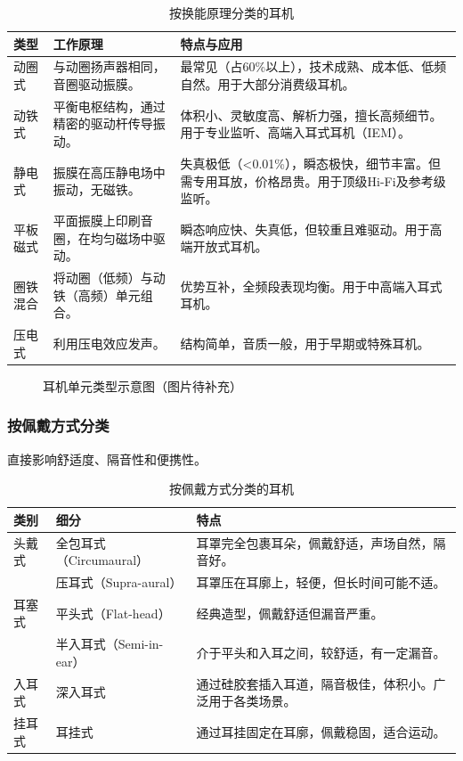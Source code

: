 \documentclass[12pt,UTF8]{ctexbook}
\begin{document}
\begin{table}[h]
\centering
\caption{按换能原理分类的耳机}
\label{tab:headphone_principle}
\begin{tabular}{p{2.5cm}p{4cm}p{6.5cm}}
\toprule
\textbf{类型} & \textbf{工作原理} & \textbf{特点与应用} \\
\midrule
动圈式 & 与动圈扬声器相同，音圈驱动振膜。 & 最常见（占60\%以上），技术成熟、成本低、低频自然。用于大部分消费级耳机。 \\
动铁式 & 平衡电枢结构，通过精密的驱动杆传导振动。 & 体积小、灵敏度高、解析力强，擅长高频细节。用于专业监听、高端入耳式耳机（IEM）。 \\
静电式 & 振膜在高压静电场中振动，无磁铁。 & 失真极低（<0.01\%），瞬态极快，细节丰富。但需专用耳放，价格昂贵。用于顶级Hi-Fi及参考级监听。 \\
平板磁式 & 平面振膜上印刷音圈，在均匀磁场中驱动。 & 瞬态响应快、失真低，但较重且难驱动。用于高端开放式耳机。 \\
圈铁混合 & 将动圈（低频）与动铁（高频）单元组合。 & 优势互补，全频段表现均衡。用于中高端入耳式耳机。 \\
压电式 & 利用压电效应发声。 & 结构简单，音质一般，用于早期或特殊耳机。 \\
\bottomrule
\end{tabular}
\end{table}
	
	\begin{figure}[h]
		\centering
		\caption{耳机单元类型示意图（图片待补充）}
		\label{fig:headphone_driver}
	\end{figure}
	
\subsubsection{按佩戴方式分类}

直接影响舒适度、隔音性和便携性。
	
\begin{table}[h]
\centering
\caption{按佩戴方式分类的耳机}
\begin{tabular}{p{3cm}p{4cm}p{5cm}}
\toprule
\textbf{类别} & \textbf{细分} & \textbf{特点} \\
\midrule
头戴式 & 全包耳式（Circumaural） & 耳罩完全包裹耳朵，佩戴舒适，声场自然，隔音好。 \\
& 压耳式（Supra-aural） & 耳罩压在耳廓上，轻便，但长时间可能不适。 \\
耳塞式 & 平头式（Flat-head） & 经典造型，佩戴舒适但漏音严重。 \\
& 半入耳式（Semi-in-ear） & 介于平头和入耳之间，较舒适，有一定漏音。 \\
入耳式 & 深入耳式 & 通过硅胶套插入耳道，隔音极佳，体积小。广泛用于各类场景。 \\
挂耳式 & 耳挂式 & 通过耳挂固定在耳廓，佩戴稳固，适合运动。 \\
\bottomrule
\end{tabular}
\end{table}
	
\end{document}
